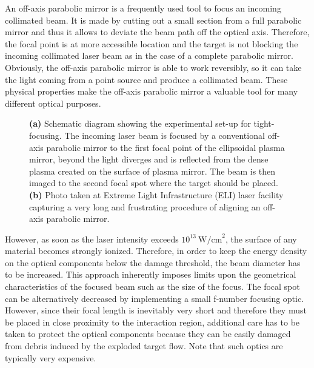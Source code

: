An off-axis parabolic mirror is a frequently used tool to focus an incoming collimated beam. It is made by cutting out a small section from a full parabolic mirror and thus it allows to deviate the beam path off the optical axis. Therefore, the focal point is at more accessible location and the target is not blocking the incoming collimated laser beam as in the case of a complete parabolic mirror. Obviously, the off-axis parabolic mirror is able to work reversibly, so it can take the light coming from a point source and produce a collimated beam. These physical properties make the off-axis parabolic mirror a valuable tool for many different optical purposes.

\begin{figure}[h!]
	\centering
	\hspace{5mm}
	\caption{\textbf{(a)} Schematic diagram showing the experimental set-up for tight-focusing. The incoming laser beam is focused by a conventional off-axis parabolic mirror to the first focal point of the ellipsoidal plasma mirror, beyond the light diverges and is reflected from the dense plasma created on the surface of plasma mirror. The beam is then imaged to the second focal spot where the target should be placed. \textbf{(b)} Photo taken at Extreme Light Infrastructure (ELI) laser facility capturing a very long and frustrating procedure of aligning an off-axis parabolic mirror.}
	\label{fig:9}
\end{figure}

However, as soon as the laser intensity exceeds $ 10^{13} \ \mathrm{W/cm}^{2} $, the surface of any material becomes strongly ionized. Therefore, in order to keep the energy density on the optical components below the damage threshold, the beam diameter has to be increased. This approach inherently imposes limits upon the geometrical characteristics of the focused beam such as the size of the focus. The focal spot can be alternatively decreased by implementing a small f-number focusing optic. However, since their focal length is inevitably very short and therefore they must be placed in close proximity to the interaction region, additional care has to be taken to protect the optical components because they can be easily damaged from debris induced by the exploded target flow. Note that such optics are typically very expensive.